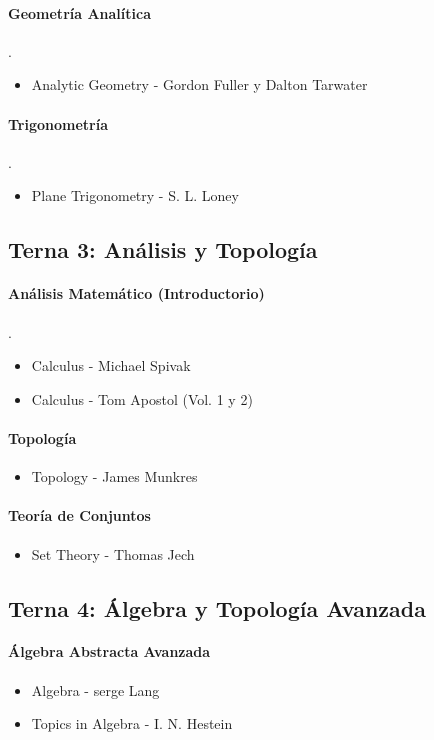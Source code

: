 \documentclass{article}
\begin{document}
\paragraph*{Geometr\'ia Anal\'itica}.
\begin{itemize}
	\item Analytic Geometry - Gordon Fuller y Dalton Tarwater
\end{itemize}
\paragraph*{Trigonometr\'ia}.
\begin{itemize}
	\item Plane Trigonometry - S. L. Loney
\end{itemize}
\subsection*{Terna 3: An\'alisis y Topolog\'ia}
\paragraph*{An\'alisis Matem\'atico (Introductorio)}.
\begin{itemize}
	\item Calculus - Michael Spivak
	\item Calculus - Tom Apostol (Vol. 1 y 2)
\end{itemize}
\paragraph*{Topolog\'ia}
\begin{itemize}
	\item Topology - James Munkres
\end{itemize}
\paragraph*{Teor\'ia de Conjuntos}
\begin{itemize}
	\item Set Theory - Thomas Jech
\end{itemize}
\subsection*{Terna 4: \'Algebra y Topolog\'ia Avanzada}
\paragraph*{\'Algebra Abstracta Avanzada}
\begin{itemize}
	\item Algebra - serge Lang
	\item Topics in Algebra - I. N. Hestein
\end{itemize}
\end{document}
